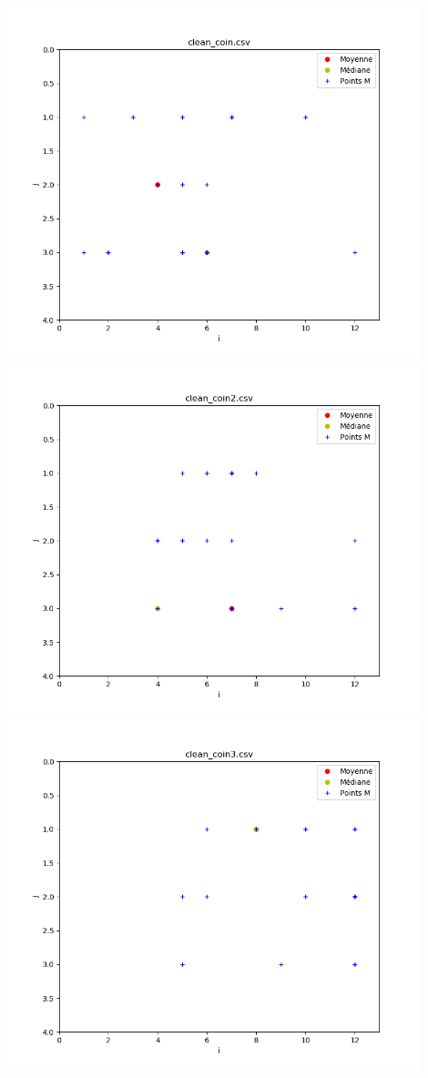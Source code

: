 \documentclass[french, a4paper, 12pt, parskip]{scrartcl}
\begin{document}
\begin{center}
  \includegraphics[width=0.9\textwidth]{finger3-f1.png}
  \includegraphics[width=0.9\textwidth]{finger3-f2.png}
  \includegraphics[width=0.9\textwidth]{finger3-f3.png}

\end{center}
\end{document}
